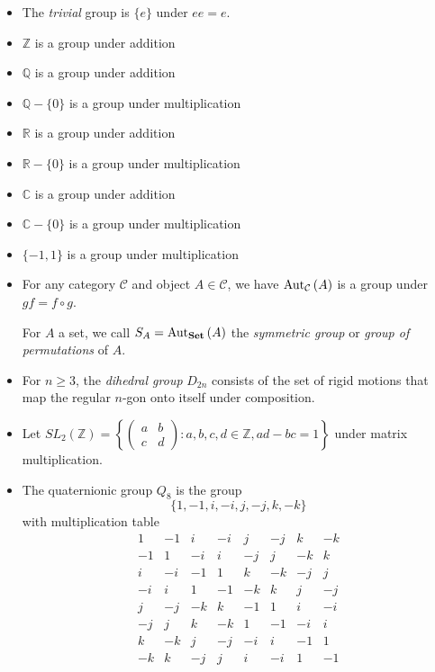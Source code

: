 \begin{ex}
    \begin{itemize}
        \item
              The \emph{trivial} group is $\{e\}$ under $ee = e$.
        \item $\mathbb{Z}$ is a group under addition %
        \item $\mathbb{Q}$ is a group under addition %
        \item $\mathbb{Q} - \{0\}$ is a group under multiplication
        \item $\mathbb{R}$ is a group under addition %
        \item $\mathbb{R} - \{0\}$ is a group under multiplication
        \item $\mathbb{C}$ is a group under addition %
        \item $\mathbb{C} - \{0\}$ is a group under multiplication
        \item $\{-1,1\}$ is a group under multiplication
        \item For any category $\mathcal{C}$ and object $A \in \mathcal{C}$, we have
              $\mathrm{Aut}_{\mathcal{C}} \left( {A} \right)$ is a group under $gf = f \circ g$.

              For $A$ a set, we call $S_A = \mathrm{Aut}_{\mathbf{Set}} \left( {A} \right)$ the \emph{symmetric group} or
              \emph{group of permutations} of $A$.

        \item For $n \geq 3$, the \emph{dihedral group} $D_{2n}$ consists of the set of rigid
              motions that map the regular $n$-gon onto itself under composition.
              \item Let $SL_2(\mathbb{Z}) = \left\{ \left( \begin{array}{cc}
              a & b \\
              c & d \end{array} \right)
              : a,b,c,d \in \mathbb{Z}, ad - bc = 1 \right\}$ under matrix multiplication.
\item The quaternionic group $Q_8$ is the group
\[ \{ 1, -1, i, -i, j, -j, k, -k \} \]
with multiplication table
\[ \begin{array}{cccccccc}
1 & -1 & i & -i & j & -j & k & -k \\
-1 & 1 & -i & i & -j & j & -k & k \\
i & -i & -1 & 1 & k & -k & -j & j \\
-i & i & 1 & -1 & -k & k & j & -j \\
j & -j & -k & k & -1 & 1 & i & -i \\
-j & j & k & -k & 1 & -1 & -i & i \\
k & -k & j & -j & -i & i & -1 & 1 \\
-k & k & -j & j & i & -i & 1 & -1
\end{array} \]
    \end{itemize}
\end{ex}

